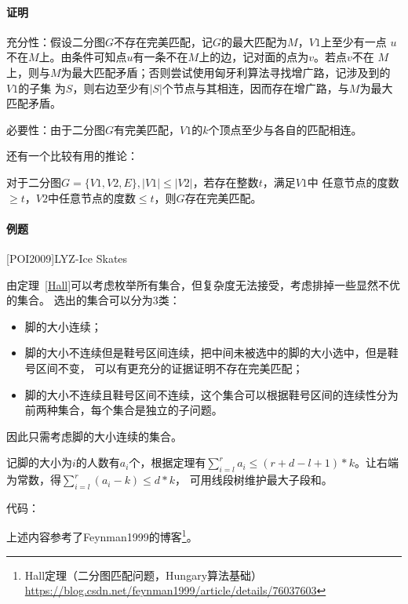 \paragraph{证明}
充分性：假设二分图$G$不存在完美匹配，记$G$的最大匹配为$M$，$V1$上至少有一点
$u$不在$M$上。由条件可知点$u$有一条不在$M$上的边，记对面的点为$v$。若点$v$不在
$M$上，则与$M$为最大匹配矛盾；否则尝试使用匈牙利算法寻找增广路，记涉及到的$V1$的子集
为$S$，则右边至少有$|S|$个节点与其相连，因而存在增广路，与$M$为最大匹配矛盾。

必要性：由于二分图$G$有完美匹配，$V1$的$k$个顶点至少与各自的匹配相连。

还有一个比较有用的推论：
\begin{inference}
   对于二分图$G=\{V1,V2,E\},|V1|\leq|V2|$，若存在整数$t$，满足$V1$中
   任意节点的度数$\geq t$，$V2$中任意节点的度数$\leq t$，则$G$存在完美匹配。
\end{inference}

\paragraph{例题}
[POI2009]LYZ-Ice Skates

由定理~\ref{Hall}可以考虑枚举所有集合，但复杂度无法接受，考虑排掉一些显然不优的集合。
选出的集合可以分为3类：
\begin{itemize}
    \item 脚的大小连续；
    \item 脚的大小不连续但是鞋号区间连续，把中间未被选中的脚的大小选中，但是鞋号区间不变，
    可以有更充分的证据证明不存在完美匹配；
    \item 脚的大小不连续且鞋号区间不连续，这个集合可以根据鞋号区间的连续性分为
    前两种集合，每个集合是独立的子问题。
\end{itemize}
因此只需考虑脚的大小连续的集合。

记脚的大小为$i$的人数有$a_i$个，根据定理有$\displaystyle \sum_{i=l}^r{a_i}
\leq (r+d-l+1)*k$。让右端为常数，得$\displaystyle \sum_{i=l}^r{(a_i-k)}\leq d*k$，
可用线段树维护最大子段和。

代码：


上述内容参考了Feynman1999的博客\footnote{
    Hall定理（二分图匹配问题，Hungary算法基础）
    \url{https://blog.csdn.net/feynman1999/article/details/76037603}
}。
